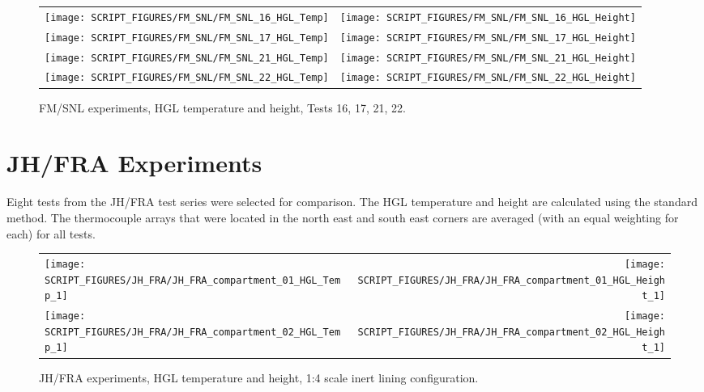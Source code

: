 \begin{figure}[p]
\begin{tabular*}{\textwidth}{l@{\extracolsep{\fill}}r}
\texttt{[image: SCRIPT\_FIGURES/FM\_SNL/FM\_SNL\_16\_HGL\_Temp]} &
\texttt{[image: SCRIPT\_FIGURES/FM\_SNL/FM\_SNL\_16\_HGL\_Height]} \\
\texttt{[image: SCRIPT\_FIGURES/FM\_SNL/FM\_SNL\_17\_HGL\_Temp]} &
\texttt{[image: SCRIPT\_FIGURES/FM\_SNL/FM\_SNL\_17\_HGL\_Height]} \\
\texttt{[image: SCRIPT\_FIGURES/FM\_SNL/FM\_SNL\_21\_HGL\_Temp]} &
\texttt{[image: SCRIPT\_FIGURES/FM\_SNL/FM\_SNL\_21\_HGL\_Height]} \\
\texttt{[image: SCRIPT\_FIGURES/FM\_SNL/FM\_SNL\_22\_HGL\_Temp]} &
\texttt{[image: SCRIPT\_FIGURES/FM\_SNL/FM\_SNL\_22\_HGL\_Height]}
\end{tabular*}
\caption[FM/SNL experiments, HGL temperature and height, Tests 16, 17, 21, 22]
{FM/SNL experiments, HGL temperature and height, Tests 16, 17, 21, 22.}
\label{FM_SNL_HGL_5}
\end{figure}

\clearpage


\clearpage

\section{JH/FRA Experiments}

Eight tests from the JH/FRA test series were selected for comparison. The HGL temperature and height are calculated using the standard method. The thermocouple arrays that were located in the north east and south east corners are averaged (with an equal weighting for each) for all tests.


\begin{figure}[!h]
\begin{tabular*}{\textwidth}{l@{\extracolsep{\fill}}r}
\texttt{[image: SCRIPT\_FIGURES/JH\_FRA/JH\_FRA\_compartment\_01\_HGL\_Temp\_1]} &
\texttt{[image: SCRIPT\_FIGURES/JH\_FRA/JH\_FRA\_compartment\_01\_HGL\_Height\_1]} \\
\texttt{[image: SCRIPT\_FIGURES/JH\_FRA/JH\_FRA\_compartment\_02\_HGL\_Temp\_1]} &
\texttt{[image: SCRIPT\_FIGURES/JH\_FRA/JH\_FRA\_compartment\_02\_HGL\_Height\_1]} \\
\end{tabular*}
\caption[JH/FRA experiments, HGL temperature and height, 1:4 scale inert lining]
{JH/FRA experiments, HGL temperature and height, 1:4 scale inert lining configuration.}
\label{JH_FRA_HGL_1}
\end{figure}

